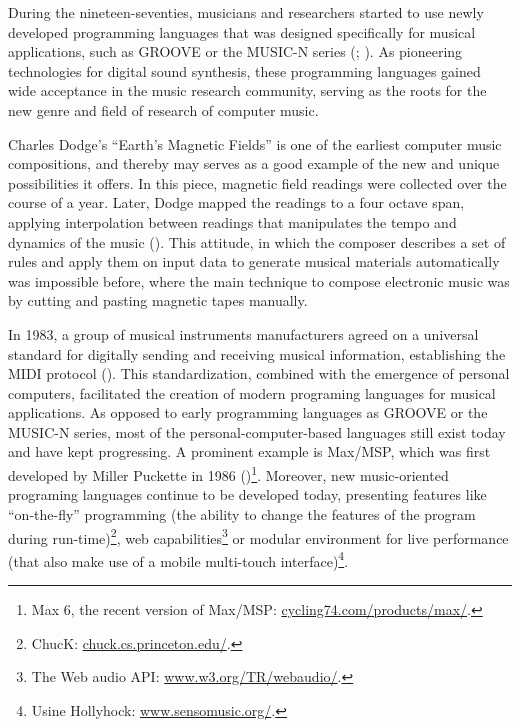 \documentclass[a4paper,11pt]{article}
\begin{document}
During the nineteen-seventies, musicians and researchers started to use newly developed programming languages that was designed specifically for musical applications, such as GROOVE or the MUSIC-N series (\cite{mathews70}; \cite{mathews69}).
As pioneering technologies for digital sound synthesis, these programming languages gained wide acceptance in the music research community, serving as the roots for the new genre and field of research of computer music.

Charles Dodge's ``Earth's Magnetic Fields'' is one of the earliest computer music compositions, and thereby may serves as a good example of the new and unique possibilities it offers.
In this piece, magnetic field readings were collected over the course of a year.
Later, Dodge mapped the readings to a four octave span, applying interpolation between readings that manipulates the tempo and dynamics of the music (\cite{scriptsgrooves14}).
This attitude, in which the composer describes a set of rules and apply them on input data to generate musical materials automatically was impossible before, where the main technique to compose electronic music was by cutting and pasting magnetic tapes manually.

In 1983, a group of musical instruments manufacturers agreed on a universal standard for digitally sending and receiving musical information, establishing the MIDI protocol (\cite{web:quinn}).
This standardization, combined with the emergence of personal computers, facilitated the creation of modern programing languages for musical applications.
As opposed to early programming languages as GROOVE or the MUSIC-N series, most of the personal-computer-based languages still exist today and have kept progressing.
A prominent example is Max/MSP, which was first developed by Miller Puckette in 1986 (\cite[p. 16]{winkler01})\footnote{Max 6, the recent version of Max/MSP: \href{http://cycling74.com/products/max/}{cycling74.com/products/max/}.}.
Moreover, new music-oriented programing languages continue to be developed today, presenting features like ``on-the-fly'' programming (the ability to change the features of the program during run-time)\footnote{ChucK: \href{http://chuck.cs.princeton.edu/}{chuck.cs.princeton.edu/}.}, web capabilities\footnote{The Web audio API: \href{http://www.w3.org/TR/webaudio/}{www.w3.org/TR/webaudio/}.} or modular environment for live performance (that also make use of a mobile multi-touch interface)\footnote{Usine Hollyhock: \href{http://www.sensomusic.org/}{www.sensomusic.org/}.}.
\end{document}
